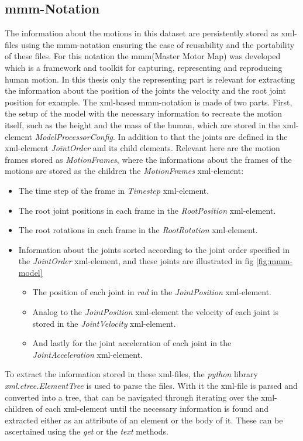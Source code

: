 		\subsection{mmm-Notation} \label{subsec:mmm-notation}
			The information about the motions in this dataset are persistently stored as xml-files using the mmm-notation ensuring the ease of reusability and the portability of these files. For this notation the mmm(Master Motor Map) was developed which is a framework and toolkit for capturing, representing and reproducing human motion. In this thesis only the representing part is relevant for extracting the information about the position of the joints the velocity and the root joint position for example\cite{mmm2014}. The xml-based mmm-notation is made of two parts. First, the setup of the model with the necessary information to recreate the motion itself, such as the height and the mass of the human, which are stored in the xml-element \textit{ModelProcessorConfig}. In addition to that the joints are defined in the xml-element \textit{JointOrder} and its child elements. Relevant here are the motion frames stored as \textit{MotionFrames}, where the informations about the frames of the motions are stored as the children the \textit{MotionFrames} xml-element:
			\begin{itemize}
				\item The time step of the frame in \textit{Timestep} xml-element.
				\item The root joint positions in each frame in the \textit{RootPosition} xml-element.
				\item The root rotations in each frame in the \textit{RootRotation} xml-element.
				\item Information about the joints sorted according to the joint order specified in the \textit{JointOrder} xml-element, and these joints are illustrated in fig \ref{fig:mmm-model}
				\begin{itemize}
					\item The position of each joint in \textit{rad} in the \textit{JointPosition} xml-element.
					\item Analog to the \textit{JointPosition} xml-element the velocity of each joint is stored in the \textit{JointVelocity} xml-element.
					\item And lastly for the joint acceleration of each joint in the \\\textit{JointAcceleration} xml-element.
				\end{itemize}
			\end{itemize}
			To extract the information stored in these xml-files, the \textit{python} library \\\textit{xml.etree.ElementTree} is used to parse the files. With it the xml-file is parsed and converted into a tree, that can be navigated through iterating over the xml-children of each xml-element until the necessary information is found and extracted either as an attribute of an element or the body of it. These can be ascertained using the \textit{get} or the \textit{text} methods. 
